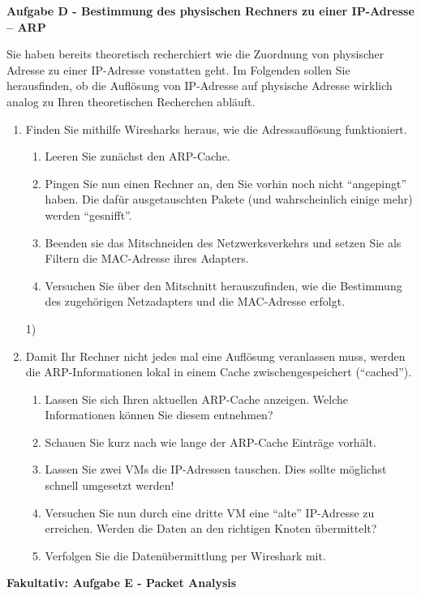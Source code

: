 \documentclass[paper=a4,fontsize=11pt]{scrartcl}%
\begin{document}
\begin{center}
\Large{\textbf{Aufgabe D - Bestimmung des physischen Rechners zu einer IP-Adresse -- ARP}}
\end{center}\vskip0.25in
Sie haben bereits theoretisch recherchiert wie die Zuordnung von physischer Adresse zu einer IP-Adresse vonstatten geht. Im Folgenden sollen Sie herausfinden, ob die Auflösung von IP-Adresse auf physische Adresse wirklich analog zu Ihren theoretischen Recherchen abläuft.
\begin{enumerate}
	\item Finden Sie mithilfe Wiresharks heraus, wie die Adressauflösung funktioniert.
		\begin{enumerate}
			\item Leeren Sie zunächst den ARP-Cache.
			\item Pingen Sie nun einen Rechner an, den Sie vorhin noch nicht \enquote{angepingt} haben. Die dafür ausgetauschten Pakete (und wahrscheinlich einige mehr) werden \enquote{gesnifft}.
			\item Beenden sie das Mitschneiden des Netzwerksverkehrs und setzen Sie als Filtern die MAC-Adresse ihres Adapters.
			\item Versuchen Sie über den Mitschnitt herauszufinden, wie die Bestimmung des zugehörigen Netzadapters und die MAC-Adresse erfolgt.
		\end{enumerate}1)
	\item Damit Ihr Rechner nicht jedes mal eine Auflösung veranlassen muss, werden die ARP-Informationen lokal in einem Cache zwischengespeichert (\enquote{cached}).
\begin{enumerate}
	\item Lassen Sie sich Ihren aktuellen ARP-Cache anzeigen. Welche Informationen können Sie diesem entnehmen?
	\item Schauen Sie kurz nach wie lange der ARP-Cache Einträge vorhält.
	\item Lassen Sie zwei VMs die IP-Adressen tauschen. Dies sollte möglichst schnell umgesetzt werden!
	\item Versuchen Sie nun durch eine dritte VM eine \enquote{alte} IP-Adresse zu erreichen. Werden die Daten an den richtigen Knoten übermittelt?
	\item Verfolgen Sie die Datenübermittlung per Wireshark mit.
\end{enumerate}
\end{enumerate}

\begin{center}
\Large{\textbf{Fakultativ: Aufgabe E - Packet Analysis}}
\end{center}\vskip0.25in
\end{document}

